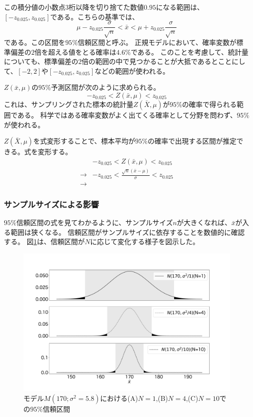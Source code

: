 この積分値の小数点$3$桁以降を切り捨てた数値$0.95$になる範囲は、$[-z_{0.025},z_{0.025}]$である。こちらの基準では、
\begin{equation*}
    \mu - z_{0.025} \frac{\sigma}{\sqrt{n}} < \bar{x} < \mu + z_{0.025} \frac{\sigma}{\sqrt{n}}
\end{equation*}
である。この区間を$95\%$信頼区間と呼ぶ。
正規モデルにおいて、確率変数が標準偏差の$2$倍を超える値をとる確率は$4.6\%$である。
このことを考慮して、統計量についても、標準偏差の$2$倍の範囲の中で見つかることが大抵であるとことにして、$[-2,2]$や$[-z_{0.025},z_{0.025}]$などの範囲が使われる。

$Z(\bar{x},\mu)$の$95\%$予測区間が次のように求められる。
$$
-z_{0.025}<Z(\bar{x},\mu)<z_{0.025}
$$
これは、サンプリングされた標本の統計量$Z(\bar{X},\mu)$が$95\%$の確率で得られる範囲である。
科学ではある確率変数がよく出てくる確率として分野を問わず、$95\%$が使われる。

$Z(\bar{X},\mu)$を式変形することで、標本平均が$95\%$の確率で出現する区間が推定できる。式を変形する。
\begin{eqnarray*}
    & -z_{0.025} < Z(\bar{x},\mu)<z_{0.025} \\
\rightarrow & -z_{0.025} < \frac{\sqrt{n}(\bar{x}-\mu)}{\sigma}  <z_{0.025} \\
\rightarrow & 
\end{eqnarray*}
\fi

\subsubsection{サンプルサイズによる影響}
$95\%$信頼区間の式を見てわかるように、サンプルサイズ$n$が大きくなれば、$\bar{x}$が入る範囲は狭くなる。
信頼区間がサンプルサイズに依存することを数値的に確認する。
図\ref{fig:confidence_interval_n}は、信頼区間が$N$に応じて変化する様子を図示した。

\begin{figure}
\begin{center}
    \includegraphics[width=15cm]{./image/03_/confidence_interval.pdf}
    \caption{モデル$M(170;\sigma^2=5.8)$における(A)$N=1$,(B)$N=4$,(C)$N=10$での$95\%$信頼区間}
    \label{fig:confidence_interval_n}
    \end{center}
\end{figure}


